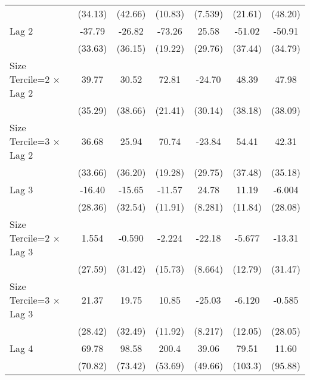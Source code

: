 \begin{table}[htbp]
\begin{tabular}{l*{6}{c}}
                &  (34.13)         &  (42.66)         &  (10.83)         &  (7.539)         &  (21.61)         &  (48.20)         \\
\addlinespace
Lag 2           &   -37.79         &   -26.82         &   -73.26\sym{***}&    25.58         &   -51.02         &   -50.91         \\
                &  (33.63)         &  (36.15)         &  (19.22)         &  (29.76)         &  (37.44)         &  (34.79)         \\
\addlinespace
Size Tercile=2 $\times$ Lag 2&    39.77         &    30.52         &    72.81\sym{***}&   -24.70         &    48.39         &    47.98         \\
                &  (35.29)         &  (38.66)         &  (21.41)         &  (30.14)         &  (38.18)         &  (38.09)         \\
\addlinespace
Size Tercile=3 $\times$ Lag 2&    36.68         &    25.94         &    70.74\sym{***}&   -23.84         &    54.41         &    42.31         \\
                &  (33.66)         &  (36.20)         &  (19.28)         &  (29.75)         &  (37.48)         &  (35.18)         \\
\addlinespace
Lag 3           &   -16.40         &   -15.65         &   -11.57         &    24.78\sym{**} &    11.19         &   -6.004         \\
                &  (28.36)         &  (32.54)         &  (11.91)         &  (8.281)         &  (11.84)         &  (28.08)         \\
\addlinespace
Size Tercile=2 $\times$ Lag 3&    1.554         &   -0.590         &   -2.224         &   -22.18\sym{*}  &   -5.677         &   -13.31         \\
                &  (27.59)         &  (31.42)         &  (15.73)         &  (8.664)         &  (12.79)         &  (31.47)         \\
\addlinespace
Size Tercile=3 $\times$ Lag 3&    21.37         &    19.75         &    10.85         &   -25.03\sym{**} &   -6.120         &   -0.585         \\
                &  (28.42)         &  (32.49)         &  (11.92)         &  (8.217)         &  (12.05)         &  (28.05)         \\
\addlinespace
Lag 4           &    69.78         &    98.58         &    200.4\sym{***}&    39.06         &    79.51         &    11.60         \\
                &  (70.82)         &  (73.42)         &  (53.69)         &  (49.66)         &  (103.3)         &  (95.88)         \\

\end{tabular}
\end{table}
